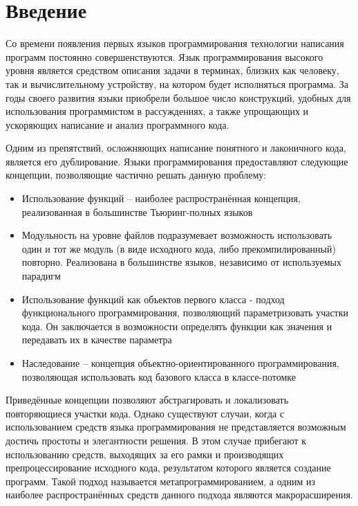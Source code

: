






\tableofcontents

\newpage


\section{Введение}

Со времени появления первых языков программирования технологии написания программ постоянно совершенствуются. Язык программирования высокого уровня является средством описания задачи в терминах, близких как человеку, так и вычислительному устройству, на котором будет исполняться программа. За годы своего развития языки приобрели большое число конструкций, удобных для использования программистом в рассуждениях, а также упрощающих и ускоряющих написание и анализ программного кода.

Одним из препятствий, осложняющих написание понятного и лаконичного кода, является его дублирование. Языки программирования предоставляют следующие концепции, позволяющие частично решать данную проблему:

\begin{itemize}
\item Использование функций -- наиболее распространённая концепция, реализованная в большинстве Тьюринг-полных языков
\item Модульность на уровне файлов подразумевает возможность использовать один и тот же модуль (в виде исходного кода, либо прекомпилированный) повторно. Реализована в большинстве языков, независимо от используемых парадигм
\item Использование функций как объектов первого класса - подход функционального программирования, позволяющий параметризовать участки кода. Он заключается в возможности определять функции как значения и передавать их в качестве параметра
\item Наследование -- концепция объектно-ориентированного программирования, позволяющая использовать код базового класса в классе-потомке
\end{itemize}

Приведённые концепции позволяют абстрагировать и локализовать повторяющиеся участки кода. Однако существуют случаи, когда с использованием средств языка программирования не представляется возможным достичь простоты и элегантности решения. В этом случае прибегают к использованию средств, выходящих за его рамки и производящих препроцессирование исходного кода, результатом которого является создание программ. Такой подход называется метапрограммированием, а одним из наиболее распространённых средств данного подхода являются макрорасширения.



